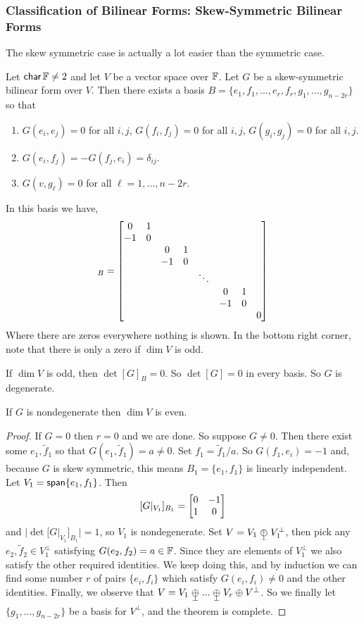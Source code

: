 \subsubsection{Classification of Bilinear Forms: Skew-Symmetric Bilinear Forms}
The skew symmetric case is actually a lot easier than the symmetric case. 
\begin{thm}
Let $\textsf{char} \operatorname{\mathbb{F}} \neq 2$ and let $V$ be a vector space over $\operatorname{\mathbb{F}}$. Let $G$ be a skew-symmetric bilinear form over $V$. Then there exists a basis $B = \{e_1,f_1,...,e_r,f_r,g_1,...,g_{n-2r}\}$ so that
\begin{enumerate}
\item {$G(e_i,e_j)=0$ for all $i,j$, $G(f_i,f_j)=0$ for all $i,j$, $G(g_i,g_j)=0$ for all $i,j$.}
\item {$G(e_i,f_j)=-G(f_j,e_i)=\delta_{ij}$.}
\item {$G(v,g_\ell)=0$ for all $\ell=1,...,n-2r$.}
\end{enumerate}
In this basis we have,
\begin{equation}
    [G]_B = \m{
    0&1& & & &\\
   -1&0& & &\\
     & &0&1& &\\
     &&-1&0& &\\
     & & & &\ddots &\\
     & & & & &0&1&\\
     & & & &&-1&0&\\
     & & & & & & &0
    }
\end{equation}
Where there are zeros everywhere nothing is shown. In the bottom right corner, note that there is only a zero if $\dim V$ is odd.
\end{thm}
\begin{remark*}
    If $\dim V$ is odd, then $\det [G]_B = 0$. So $\det [G] = 0$ in every basis. So $G$ is degenerate.
\end{remark*}
\begin{cor}
    If $G$ is nondegenerate then $\dim V$ is even.
\end{cor}
\begin{proof}
    If $G=0$ then $r=0$ and we are done. So suppose $G\neq 0$. Then there exist some $e_1,\tilde{f}_1$ so that $G(e_1,\tilde{f}_1)=a\neq 0$. Set $f_1 = \tilde{f}_1/a$. So $G(f_1,e_i)=-1$ and, because $G$ is skew symmetric, this means $B_1=\{e_1,f_1\}$ is linearly independent. Let $V_1 = \operatorname{\textsf{span}}\{e_1,f_1\}$. Then 
    \[[G|_{V_1}]_{B_1} =\begin{bmatrix}0&-1\\1&0\end{bmatrix}\]
    and $|\det [G|_{V_1}]_{B_1}| =1$, so $V_1$ is nondegenerate. Set $V=V_1\orthoplus V_1^\perp$, then pick any $e_2,\tilde{f}_2 \in V_1^\perp$ satisfying $G(e_2,f_2)=a\in \operatorname{\mathbb{F}}$. Since they are elements of $V_1^\perp$ we also satisfy the other required identities. We keep doing this, and by induction we can find some number $r$ of pairs $\{e_i,f_i\}$ which satisfy $G(e_i,f_i)\neq 0$ and the other identities. Finally, we observe that $V = V_1\orthoplus ...\orthoplus V_r \oplus V^\perp$. So we finally let $\{g_1,...,g_{n-2r}\}$ be a basis for $V^\perp$, and the theorem is complete.
\end{proof}
